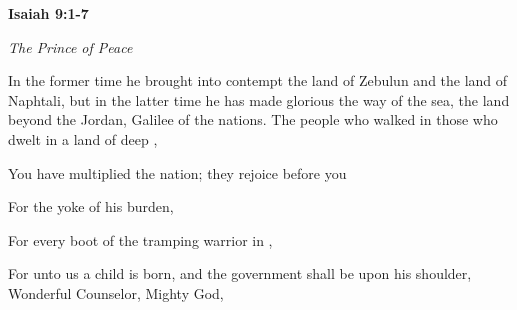 \documentclass[11pt]{article}
\begin{document}
{
    \textbf{\large Isaiah 9:1-7}

    \textit{The Prince of Peace}
}

\newpage

\begin{biblicaloutline}[Isaiah 9:1b-7]

    \begin{versesection}{2em}
         In the former time he brought into contempt the land of Zebulun and the land of Naphtali, but in the latter time he has made glorious the way of the sea, the land beyond the Jordan, Galilee of the nations.
        {\vspace{1em}}
        { The people who walked in }
        those who dwelt in a land of deep ,

        { You have multiplied the nation;}
        {they rejoice before you}
    \end{versesection}

    \begin{versesection}{2em}
        { For the yoke of his burden,}

        { For every boot of the tramping warrior} in ,
    \end{versesection}

    \begin{versesection}{2em}
        { For unto us a child is born,}
        {and the government shall be upon his shoulder,}
        {Wonderful Counselor, Mighty God,}


\end{versesection}
\end{biblicaloutline}
\end{document}
